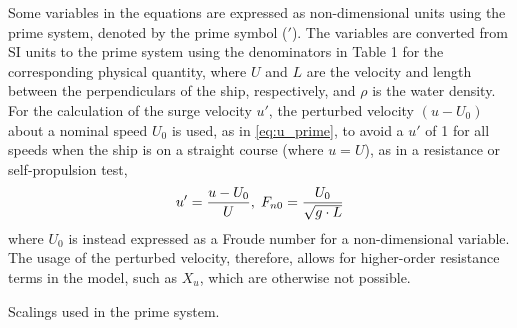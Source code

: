 \noindent Some variables in the equations are expressed as non-dimensional units using the prime system, denoted by the prime symbol ($'$). The variables are converted from SI units to the prime system using the denominators in Table 1 for the corresponding physical quantity, where $U$ and $L$ are the velocity and length between the perpendiculars of the ship, respectively, and $\rho$ is the water density.
For the calculation of the surge velocity $u'$, the perturbed velocity $(u-U_0)$ about a nominal speed $U_0$ is used, as in  \autoref{eq:u_prime}, to avoid a $u'$ of 1 for all speeds when the ship is on a straight course (where $u=U$), as in a resistance or self-propulsion test, 
\begin{equation}
    \label{eq:u_prime}
    u' = \frac{u-U_0}{U}, \hspace{0.1cm}
    F_{n0} = \frac{U_0}{\sqrt{g \cdot L}}
\end{equation}
where $U_0$ is instead expressed as a Froude number for a non-dimensional variable.
The usage of the perturbed velocity, therefore, allows for higher-order resistance terms in the model, such as $X_{u}$, which are otherwise not possible. 
\begin{table}[h]\label{tab:prime_system}
    \caption{Scalings used in the prime system.}
    \centering
\end{table}